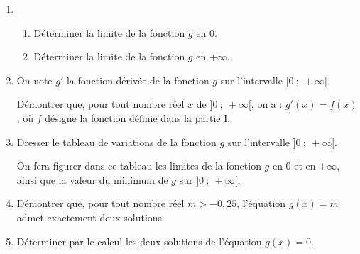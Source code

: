 \begin{enumerate}
\item 
	\begin{enumerate}
		\item Déterminer la limite de la fonction $g$ en $0$.
		\item Déterminer la limite de la fonction $g$ en $+ \infty$.
	\end{enumerate}
\item On note $g'$ la fonction dérivée de la fonction $g$ sur l'intervalle $]0~;~+\infty[$.

Démontrer que, pour tout nombre réel $x$ de $]0~;~+\infty[$, on a : $g'(x) = f(x)$, où $f$ désigne la fonction définie dans la partie I.
\item Dresser le tableau de variations de la fonction $g$ sur l'intervalle $]0~;~+\infty[$.

On fera figurer dans ce tableau les limites de la fonction $g$ en $0$ et en $+\infty$, ainsi que la valeur du minimum de $g$ sur $]0~;~+\infty[$.
\item Démontrer que, pour tout nombre réel $m > - 0,25$, l'équation $g(x) = m$ admet exactement deux solutions.
\item Déterminer par le calcul les deux solutions de l'équation $g(x) = 0$.
\end{enumerate}

